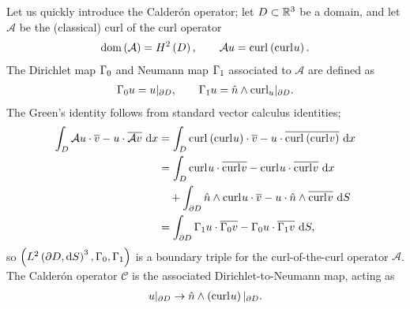 Let us quickly introduce the Calder\'{o}n operator; let $D\subset\mathbb{R}^3$ be a domain, and let $\mathcal{A}$ be the (classical) curl of the curl operator
\begin{align*}
	\mathrm{dom}\left( \mathcal{A} \right) = H^2\left( D \right), \qquad
	\mathcal{A}u = \mathrm{curl}_{}\left( \mathrm{curl}_{}u \right).
\end{align*}
The Dirichlet map $\Gamma_0$ and Neumann map $\Gamma_1$ associated to $\mathcal{A}$ are defined as
\begin{align} \label{eq:ClassicalEM-DNMaps}
	\Gamma_0 u = u\vert_{\partial D}, \qquad
	\Gamma_1 u = \hat{n}\wedge\mathrm{curl}_{u}\vert_{\partial D}.
\end{align}
The Green's identity follows from standard vector calculus identities;
\begin{align*}
	\int_{D} \mathcal{A}u \cdot \overline{v} - u \cdot \overline{\mathcal{A}v}  \ \mathrm{d}x
	&= \int_{D} \mathrm{curl}_{}\left( \mathrm{curl}_{}u \right)\cdot\overline{v} - u\cdot\overline{\mathrm{curl}_{}\left( \mathrm{curl}_{}v \right)}  \ \mathrm{d}x \\
	&= \int_{D} \mathrm{curl}_{}u\cdot\overline{\mathrm{curl}_{}v} - \mathrm{curl}_{}u\cdot\overline{\mathrm{curl}_{}v}  \ \mathrm{d}x \\
	&\quad + \int_{\partial D} \hat{n}\wedge\mathrm{curl}_{}u\cdot\overline{v} - u\cdot\hat{n}\wedge\overline{\mathrm{curl}_{}v}  \ \mathrm{d}S \\
	&= \int_{\partial D} \Gamma_1 u \cdot \overline{\Gamma_0 v} - \Gamma_0 u \cdot \overline{\Gamma_1 v}  \ \mathrm{d}S,
\end{align*}
so $\left( L^{2}\left( \partial D,\mathrm{d} S \right)^3, \Gamma_0, \Gamma_1 \right)$ is a boundary triple for the curl-of-the-curl operator $\mathcal{A}$.
The Calder\'{o}n operator $\mathcal{C}$ is the associated Dirichlet-to-Neumann map, acting as
\begin{align*}
	u\vert_{\partial D} \rightarrow \hat{n}\wedge\left( \mathrm{curl}_{}u \right)\vert_{\partial D}.
\end{align*}

